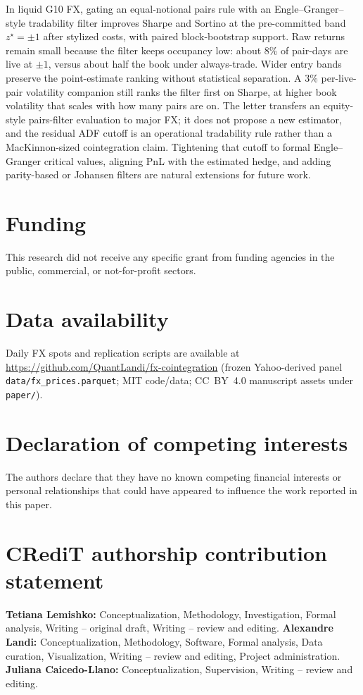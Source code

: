 \documentclass[11pt,a4paper]{article}
\begin{document}
In liquid G10 FX, gating an equal-notional pairs rule with an Engle--Granger--style
tradability filter improves Sharpe and Sortino at the pre-committed band $z^{\star}=\pm 1$
after stylized costs, with paired block-bootstrap support. Raw returns remain small because
the filter keeps occupancy low: about 8\% of pair-days are live at $\pm 1$, versus about
half the book under always-trade. Wider entry bands preserve the point-estimate ranking
without statistical separation. A 3\% per-live-pair volatility companion still ranks the
filter first on Sharpe, at higher book volatility that scales with how many pairs are on.
The letter transfers an equity-style pairs-filter evaluation to major FX; it does not propose
a new estimator, and the residual ADF cutoff is an operational tradability rule rather than a
MacKinnon-sized cointegration claim. Tightening that cutoff to formal Engle--Granger critical
values, aligning PnL with the estimated hedge, and adding parity-based or Johansen filters
are natural extensions for future work.

\section*{Funding}
This research did not receive any specific grant from funding agencies in the public,
commercial, or not-for-profit sectors.

\section*{Data availability}
Daily FX spots and replication scripts are available at
\url{https://github.com/QuantLandi/fx-cointegration} (frozen Yahoo-derived panel
\texttt{data/fx\_prices.parquet}; MIT code/data; CC~BY~4.0 manuscript assets under
\texttt{paper/}).

\section*{Declaration of competing interests}
The authors declare that they have no known competing financial interests or personal
relationships that could have appeared to influence the work reported in this paper.

\section*{CRediT authorship contribution statement}
\textbf{Tetiana Lemishko:} Conceptualization, Methodology, Investigation, Formal analysis,
Writing -- original draft, Writing -- review and editing.
\textbf{Alexandre Landi:} Conceptualization, Methodology, Software, Formal analysis, Data
curation, Visualization, Writing -- review and editing, Project administration.
\textbf{Juliana Caicedo-Llano:} Conceptualization, Supervision, Writing -- review and editing.

\printbibliography
\end{document}
